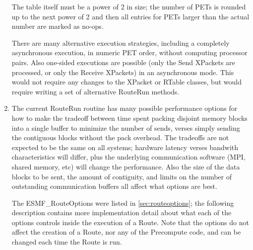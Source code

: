 \begin{enumerate}
The table itself must be a power of 2 in size; the number of
PETs is rounded up to the next power of 2 and then all entries
for PETs larger than the actual number are marked as no-ops.

There are many alternative execution strategies, including a
completely asynchronous execution, in numeric PET order, without
computing processor pairs.  Also one-sided executions are
possible (only the Send XPackets are processed, or only
the Receive XPackets) in an asynchronous mode.  This would
not require any changes to the XPacket or RTable classes,
but would require writing a set of alternative RouteRun methods.

\item

The current RouteRun routine has many possible performance options for how
to make the tradeoff between time spent packing disjoint memory
blocks into a single buffer to minimize the number of sends,
verses simply sending the contiguous blocks without the pack overhead.
The tradeoffs are not expected to be the same on all systems;
hardware latency verses bandwith characteristics will differ,
plus the underlying communication software (MPI, shared memory, etc)
will change the performance.  Also the size of the data blocks
to be sent, the amount of contiguity, and limits on the number 
of outstanding communication buffers all affect what options are best.

The ESMF\_RouteOptions were listed in \ref{sec:routeoptions}; 
the following description contains more implementation detail 
about what each of the options
controls inside the execution of a Route.  Note that the options
do not affect the creation of a Route, nor any of the Precompute
code, and can be changed each time the Route is run.


\end{enumerate}
